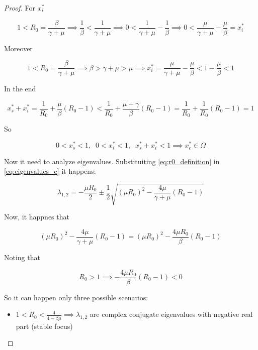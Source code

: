 \begin{proof}
For $x_i^*$

\begin{equation}
    1 < R_0 = \frac{\beta}{\gamma + \mu} \implies \frac{1}{\beta} < \frac{1}{\gamma + \mu} \implies 0 < \frac{1}{\gamma + \mu} - \frac{1}{\beta} \implies 0 < \frac{\mu}{\gamma + \mu} - \frac{\mu}{\beta} = x_i^*
\end{equation}

Moreover

\begin{equation}
    1 < R_0 = \frac{\beta}{\gamma + \mu} \implies \beta > \gamma + \mu > \mu \implies x_i^* = \frac{\mu}{\gamma + \mu} - \frac{\mu}{\beta} < 1 - \frac{\mu}{\beta} < 1
\end{equation}

In the end

\begin{equation}
    x_s^* + x_i^* = \frac{1}{R_0} + \frac{\mu}{\beta}\left(R_0 - 1\right) < \frac{1}{R_0} + \frac{\mu+\gamma}{\beta}\left(R_0 - 1\right) =  \frac{1}{R_0} + \frac{1}{R_0}\left(R_0 - 1\right) = 1
\end{equation}

So

\begin{equation}
    0 < x_s^* < 1, \;\; 0 < x_i^* < 1, \;\; x_s^* + x_i^* < 1 \implies x_e^* \in \Omega 
\end{equation}

Now it need to analyze eigenvalues. Substituiting \ref{eq:r0_definition} in \ref{eq:eigenvalues_e} it happens:

\begin{equation}
    \lambda_{1,2} = -\frac{\mu R_0}{2} \pm \frac{1}{2}\sqrt{\left(\mu R_0\right)^2-\frac{4\mu}{\gamma + \mu}(R_0 - 1)}
\end{equation}

Now, it happnes that

\begin{equation}
    \left(\mu R_0\right)^2-\frac{4\mu}{\gamma + \mu}(R_0 - 1) = \left(\mu R_0\right)^2-\frac{4\mu R_0}{\beta}(R_0 - 1)
\end{equation}

Noting that

\begin{equation}
    R_0 > 1 \implies -\frac{4\mu R_0}{\beta}(R_0 - 1) < 0
\end{equation}

So it can happen only three possible scenarios:

\begin{itemize}
    \item $1 < R_0 < \frac{4}{4-\beta \mu} \implies \lambda_{1,2}$ are complex conjugate eigenvalues with negative real part (stable focus)
    

\end{itemize}
\end{proof}
